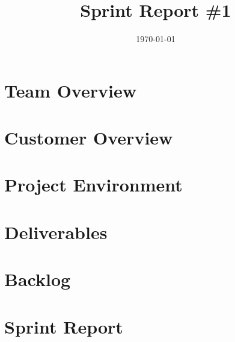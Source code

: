 \documentclass{article}
\title{Sprint Report \#1}
\date{\today}
\begin{document}
\section{Team Overview}

\section{Customer Overview}

\section{Project Environment}

\section{Deliverables}

\section{Backlog}

\section{Sprint Report}
\end{document}
